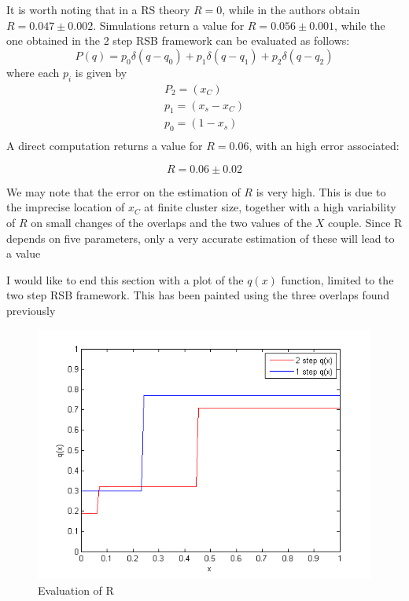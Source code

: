 It is worth noting that in a RS theory $R=0$, while in \cite{bethe} the authors obtain $R = 0.047 \pm 0.002$. Simulations return a value for $R=0.056 \pm 0.001$, while the one obtained in the 2 step RSB framework can be evaluated as follows:
\begin{equation}
P(q) = p_0 \delta(q-q_0) + p_1 \delta(q-q_1) + p_2 \delta(q-q_2)
\end{equation}
where each $p_i$ is given by
\begin{eqnarray}
P_2 = (x_C) \nonumber \\
p_1 = (x_s - x_C) \nonumber \\
p_0 = (1 -  x_s)  \nonumber \\
\end{eqnarray}
A direct computation returns a value for $R =0.06$, with an high error associated:

\begin{equation}
                        R =0.06 \pm 0.02
\end{equation}

We may note that the error on the estimation of $R$ is very high. This is due to the imprecise location of $x_C$ at finite cluster size, together with a high variability of $R$ on small changes of the overlaps and the two values of the $X$ couple. Since R depends on five parameters, only a very accurate estimation of these will lead to a value

I would like to end this section with a plot of the $q(x)$ function, limited to the two step RSB framework. This has been painted using the three overlaps found previously

\begin{figure}
  \centering
  \includegraphics{img/q_function.png}
  \caption{Evaluation of R}
\end{figure}
